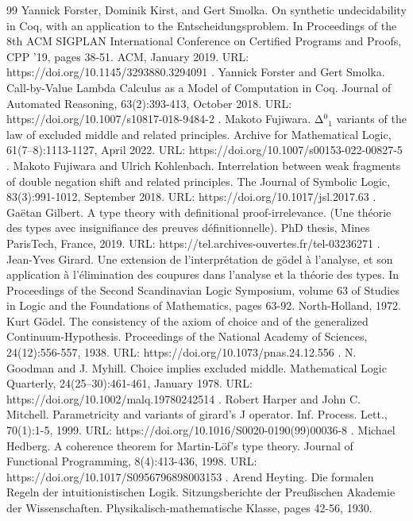 \documentclass[10pt,a4paper]{amsart}
\begin{document}
\begin{thebibliography}{99}
 Yannick Forster, Dominik Kirst, and Gert Smolka. On synthetic undecidability in Coq, with an application to the Entscheidungsproblem. In Proceedings of the 8th ACM SIGPLAN International Conference on Certified Programs and Proofs, CPP ’19, pages 38-51. ACM, January 2019. URL: https://doi.org/10.1145/3293880.3294091 .
 Yannick Forster and Gert Smolka. Call-by-Value Lambda Calculus as a Model of Computation in Coq. Journal of Automated Reasoning, 63(2):393-413, October 2018. URL: https://doi.org/10.1007/s10817-018-9484-2 .
 Makoto Fujiwara. Δ\ensuremath{{}^{0}}\ensuremath{{}_{1}} variants of the law of excluded middle and related principles. Archive for Mathematical Logic, 61(7–8):1113-1127, April 2022. URL: https://doi.org/10.1007/s00153-022-00827-5 .
 Makoto Fujiwara and Ulrich Kohlenbach. Interrelation between weak fragments of double negation shift and related principles. The Journal of Symbolic Logic, 83(3):991-1012, September 2018. URL: https://doi.org/10.1017/jsl.2017.63 .
 Gaëtan Gilbert. A type theory with definitional proof-irrelevance. (Une théorie des types avec insignifiance des preuves définitionnelle). PhD thesis, Mines ParisTech, France, 2019. URL: https://tel.archives-ouvertes.fr/tel-03236271 .
 Jean-Yves Girard. Une extension de l'interprétation de gödel à l'analyse, et son application à l'élimination des coupures dans l'analyse et la théorie des types. In Proceedings of the Second Scandinavian Logic Symposium, volume 63 of Studies in Logic and the Foundations of Mathematics, pages 63-92. North-Holland, 1972.
 Kurt Gödel. The consistency of the axiom of choice and of the generalized Continuum-Hypothesis. Proceedings of the National Academy of Sciences, 24(12):556-557, 1938. URL: https://doi.org/10.1073/pnas.24.12.556 .
 N. Goodman and J. Myhill. Choice implies excluded middle. Mathematical Logic Quarterly, 24(25–30):461-461, January 1978. URL: https://doi.org/10.1002/malq.19780242514 .
 Robert Harper and John C. Mitchell. Parametricity and variants of girard’s J operator. Inf. Process. Lett., 70(1):1-5, 1999. URL: https://doi.org/10.1016/S0020-0190(99)00036-8 .
 Michael Hedberg. A coherence theorem for Martin-Löf’s type theory. Journal of Functional Programming, 8(4):413-436, 1998. URL: https://doi.org/10.1017/S0956796898003153 .
 Arend Heyting. Die formalen Regeln der intuitionistischen Logik. Sitzungsberichte der Preußischen Akademie der Wissenschaften. Physikalisch-mathematische Klasse, pages 42-56, 1930.

\end{thebibliography}
\end{document}
